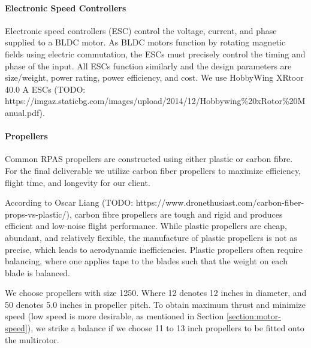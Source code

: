 \paragraph{Electronic Speed Controllers}

Electronic speed controllers (ESC) control the voltage, current, and phase supplied to a BLDC motor. As BLDC motors function by rotating magnetic fields using electric commutation, the ESCs must precisely control the timing and phase of the input. All ESCs function similarly and the design parameters are size/weight, power rating, power efficiency, and cost. We use HobbyWing XRtoor 40.0 A  ESCs (TODO: https://imgaz.staticbg.com/images/upload/2014/12/Hobbywing\%20xRotor\%20Manual.pdf).

\paragraph{Propellers}

Common RPAS propellers are constructed using either plastic or carbon fibre. For the final deliverable we utilize carbon fiber propellers to maximize efficiency, flight time, and longevity for our client. 

According to Oscar Liang (TODO: https://www.dronethusiast.com/carbon-fiber-props-vs-plastic/),  carbon fibre propellers are tough and rigid and produces efficient and low-noise flight performance.  While plastic propellers are cheap, abundant, and relatively flexible, the manufacture of plastic propellers is not as precise, which leads to aerodynamic inefficiencies. Plastic propellers often require balancing, where one applies tape to the blades such that the weight on each blade is balanced. 

We choose propellers with size 1250. Where 12 denotes 12 inches in diameter, and 50 denotes 5.0 inches in propeller pitch. To obtain maximum thrust and minimize speed (low speed is more desirable, as mentioned in Section \ref{section:motor-speed}), we strike a balance if we choose 11 to 13 inch propellers to be fitted onto the multirotor.

